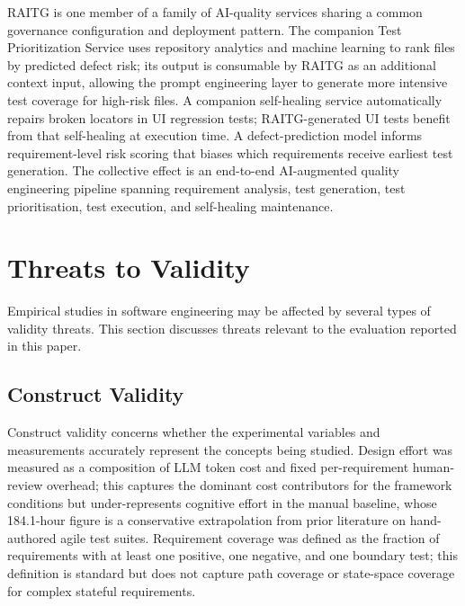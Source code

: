 \documentclass[conference]{IEEEtran}
\begin{document}
RAITG is one member of a family of AI-quality services sharing a common governance configuration and deployment pattern. The companion Test Prioritization Service uses repository analytics and machine learning to rank files by predicted defect risk; its output is consumable by RAITG as an additional context input, allowing the prompt engineering layer to generate more intensive test coverage for high-risk files. A companion self-healing service automatically repairs broken locators in UI regression tests; RAITG-generated UI tests benefit from that self-healing at execution time. A defect-prediction model informs requirement-level risk scoring that biases which requirements receive earliest test generation. The collective effect is an end-to-end AI-augmented quality engineering pipeline spanning requirement analysis, test generation, test prioritisation, test execution, and self-healing maintenance.

\section{Threats to Validity}
\label{sec:validity}

Empirical studies in software engineering may be affected by several types of validity threats. This section discusses threats relevant to the evaluation reported in this paper.

\subsection{Construct Validity}

Construct validity concerns whether the experimental variables and measurements accurately represent the concepts being studied. Design effort was measured as a composition of LLM token cost and fixed per-requirement human-review overhead; this captures the dominant cost contributors for the framework conditions but under-represents cognitive effort in the manual baseline, whose 184.1-hour figure is a conservative extrapolation from prior literature on hand-authored agile test suites. Requirement coverage was defined as the fraction of requirements with at least one positive, one negative, and one boundary test; this definition is standard but does not capture path coverage or state-space coverage for complex stateful requirements.
\end{document}
